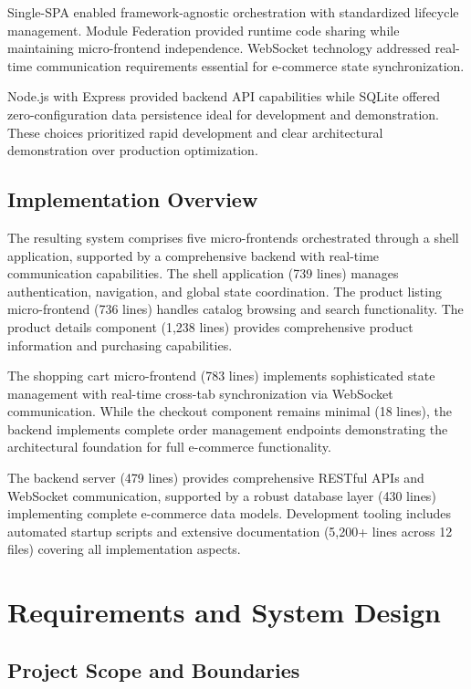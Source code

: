 \documentclass[12pt,a4paper]{report}
\begin{document}
Single-SPA enabled framework-agnostic orchestration with standardized lifecycle management. Module Federation provided runtime code sharing while maintaining micro-frontend independence. WebSocket technology addressed real-time communication requirements essential for e-commerce state synchronization.

Node.js with Express provided backend API capabilities while SQLite offered zero-configuration data persistence ideal for development and demonstration. These choices prioritized rapid development and clear architectural demonstration over production optimization.

\section{Implementation Overview}

The resulting system comprises five micro-frontends orchestrated through a shell application, supported by a comprehensive backend with real-time communication capabilities. The shell application (739 lines) manages authentication, navigation, and global state coordination. The product listing micro-frontend (736 lines) handles catalog browsing and search functionality. The product details component (1,238 lines) provides comprehensive product information and purchasing capabilities.

The shopping cart micro-frontend (783 lines) implements sophisticated state management with real-time cross-tab synchronization via WebSocket communication. While the checkout component remains minimal (18 lines), the backend implements complete order management endpoints demonstrating the architectural foundation for full e-commerce functionality.

The backend server (479 lines) provides comprehensive RESTful APIs and WebSocket communication, supported by a robust database layer (430 lines) implementing complete e-commerce data models. Development tooling includes automated startup scripts and extensive documentation (5,200+ lines across 12 files) covering all implementation aspects.

\chapter{Requirements and System Design}
\section{Project Scope and Boundaries}
\end{document}
